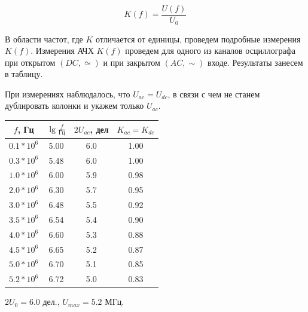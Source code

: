 \documentclass[14pt]{article}
\begin{document}
$$K(f) = \frac{U(f)}{U_0}$$

В области частот, где $K$ отличается от единицы, проведем подробные измерения $K(f)$. Измерения АЧХ $K(f)$ проведем для одного из каналов осциллографа при открытом $(DC, \simeq)$ и при закрытом $(AC, \sim)$ входе. Результаты занесем в таблицу.


При измерениях наблюдалось, что $U_{ac} = U_{dc}$, в связи с чем не станем дублировать колонки и укажем только $U_{ac}$.

\begin{center}
\begin{tabular}{|c|c|c|c|}
\hline
$f$, Гц			&	$\lg \frac{f}{\text{Гц}}$	&	$2U_{ac}$, дел	&	$K_{ac} = K_{dc}$\\
\hline
$0.1*10^{6}$	&	5.00						&	6.0				&	1.00\\
\hline
$0.3*10^{6}$	&	5.48						&	6.0				&	1.00\\
\hline
$1.0*10^{6}$	&	6.00						&	5.9				&	0.98\\
\hline
$2.0*10^{6}$	&	6.30						&	5.7				&	0.95\\
\hline
$3.0*10^{6}$	&	6.48						&	5.5				&	0.92\\
\hline
$3.5*10^{6}$	&	6.54						&	5.4				&	0.90\\
\hline
$4.0*10^{6}$	&	6.60						&	5.3				&	0.88\\
\hline
$4.5*10^{6}$	&	6.65						&	5.2				&	0.87\\
\hline
$5.0*10^{6}$	&	6.70						&	5.1				&	0.85\\
\hline
$5.2*10^{6}$	&	6.72						&	5.0				&	0.83\\
\hline
\end{tabular}
\end{center}

$2U_0 = 6.0$ дел., $U_{max} = 5.2$ МГц.

%
%

\vspace{0.5cm}
\begin{center}
\end{center}
\end{document}
